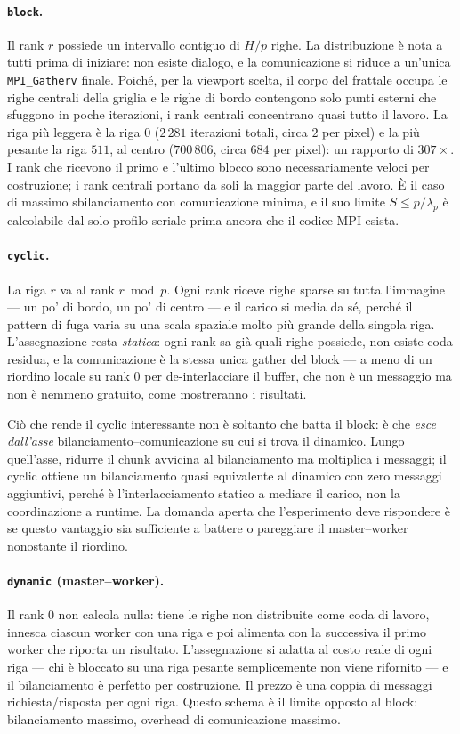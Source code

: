 \paragraph{\texttt{block}.}
Il rank $r$ possiede un intervallo contiguo di $H/p$ righe. La
distribuzione è nota a tutti prima di iniziare: non esiste dialogo, e la
comunicazione si riduce a un'unica \texttt{MPI\_Gatherv} finale. Poiché, per la
viewport scelta, il corpo del frattale occupa le righe centrali della griglia e
le righe di bordo contengono solo punti esterni che sfuggono in poche
iterazioni, i rank centrali concentrano quasi tutto il lavoro. La riga più
leggera è la riga $0$ ($2\,281$ iterazioni totali, circa $2$ per pixel) e la
più pesante la riga $511$, al centro ($700\,806$, circa $684$ per pixel): un
rapporto di $307\times$. I rank che ricevono il primo e l'ultimo blocco sono
necessariamente veloci per costruzione; i rank centrali portano da soli la
maggior parte del lavoro. È il caso di massimo sbilanciamento con comunicazione
minima, e il suo limite $S \le p/\lambda_p$ è calcolabile dal solo profilo
seriale prima ancora che il codice MPI esista.

\paragraph{\texttt{cyclic}.}
La riga $r$ va al rank $r \bmod p$. Ogni rank riceve righe sparse su tutta
l'immagine --- un po' di bordo, un po' di centro --- e il carico si media da sé,
perché il pattern di fuga varia su una scala spaziale molto più grande della
singola riga. L'assegnazione resta \emph{statica}: ogni rank sa già quali righe
possiede, non esiste coda residua, e la comunicazione è la stessa unica gather
del block --- a meno di un riordino locale su rank $0$ per de-interlacciare il
buffer, che non è un messaggio ma non è nemmeno gratuito, come mostreranno i
risultati.

Ciò che rende il cyclic interessante non è soltanto che batta il block: è che
\emph{esce dall'asse} bilanciamento--comunicazione su cui si trova il dinamico.
Lungo quell'asse, ridurre il chunk avvicina al bilanciamento ma moltiplica i
messaggi; il cyclic ottiene un bilanciamento quasi equivalente al dinamico con
zero messaggi aggiuntivi, perché è l'interlacciamento statico a mediare il
carico, non la coordinazione a runtime. La domanda aperta che l'esperimento deve
rispondere è se questo vantaggio sia sufficiente a battere o pareggiare il
master--worker nonostante il riordino.

\paragraph{\texttt{dynamic} (master--worker).}
Il rank $0$ non calcola nulla: tiene le righe non distribuite come coda di
lavoro, innesca ciascun worker con una riga e poi alimenta con la successiva il
primo worker che riporta un risultato. L'assegnazione si adatta al costo reale
di ogni riga --- chi è bloccato su una riga pesante semplicemente non viene
rifornito --- e il bilanciamento è perfetto per costruzione. Il prezzo è una
coppia di messaggi richiesta/risposta per ogni riga. Questo schema è il limite
opposto al block: bilanciamento massimo, overhead di comunicazione massimo.

